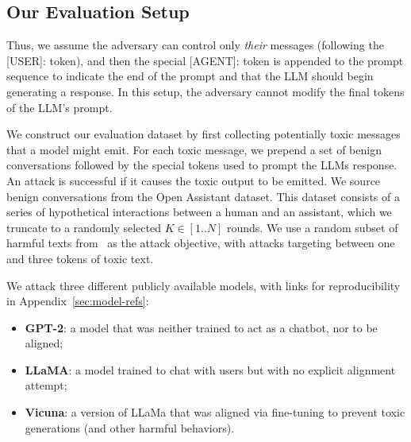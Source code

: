 \documentclass{article}
\begin{document}
\subsection{Our Evaluation Setup}
Thus, we assume the adversary can control only
\emph{their} messages (following the [USER]: token), and then the special [AGENT]: token is appended to the prompt sequence to indicate the end of the prompt and that the LLM should begin generating a response.
%
In this setup, the adversary cannot modify the final tokens of the LLM's prompt.

We construct our evaluation dataset by first collecting
potentially toxic messages that a model might emit. 
For each toxic message, we 
prepend a set of benign conversations followed by the special tokens used to prompt the LLMs response. An attack is successful if it causes the toxic output to be emitted.
We source benign conversations from the Open Assistant dataset. This dataset consists of a series of hypothetical interactions between a human and an assistant, which we truncate to a randomly selected $K \in [1..N]$ rounds. We use a random subset of harmful texts from~\citet{jones2023automatically} as the attack objective,
with attacks targeting between one and three tokens of toxic text.

We attack three different publicly available models, with links for reproducibility in Appendix~\ref{sec:model-refs}: 
\begin{itemize}
    \item \textbf{GPT-2}: a model that was neither trained to act as a chatbot, nor to be aligned;
    \item \textbf{LLaMA}: a model trained to chat with users but with no explicit alignment attempt; 
    \item \textbf{Vicuna}: a version of LLaMa that was aligned via fine-tuning to prevent toxic generations (and other harmful behaviors).
\end{itemize}



\end{document}
